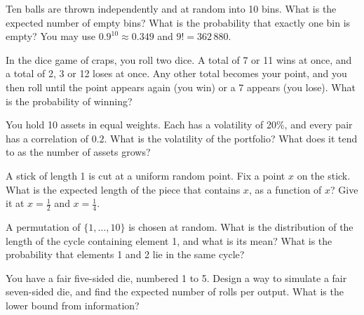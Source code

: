 
\begin{question}\label{iq:iv1:timed-test-6:7}
Ten balls are thrown independently and at random into 10 bins. What is the expected number of empty bins? What is the probability that exactly one bin is empty? You may use $0.9^{10} \approx 0.349$ and $9! = 362\,880$.
\end{question}

\begin{question}\label{iq:iv1:timed-test-6:8}
In the dice game of craps, you roll two dice. A total of 7 or 11 wins at once, and a total of 2, 3 or 12 loses at once. Any other total becomes your point, and you then roll until the point appears again (you win) or a 7 appears (you lose). What is the probability of winning?
\end{question}

\begin{question}\label{iq:iv1:timed-test-6:9}
You hold 10 assets in equal weights. Each has a volatility of 20\%, and every pair has a correlation of $0.2$. What is the volatility of the portfolio? What does it tend to as the number of assets grows?
\end{question}

\begin{question}\label{iq:iv1:timed-test-6:10}
A stick of length 1 is cut at a uniform random point. Fix a point $x$ on the stick. What is the expected length of the piece that contains $x$, as a function of $x$? Give it at $x = \frac12$ and $x = \frac14$.
\end{question}

\begin{question}\label{iq:iv1:timed-test-6:11}
A permutation of $\{1, \dots, 10\}$ is chosen at random. What is the distribution of the length of the cycle containing element 1, and what is its mean? What is the probability that elements 1 and 2 lie in the same cycle?
\end{question}

\begin{question}\label{iq:iv1:timed-test-6:12}
You have a fair five-sided die, numbered 1 to 5. Design a way to simulate a fair seven-sided die, and find the expected number of rolls per output. What is the lower bound from information?
\end{question}
